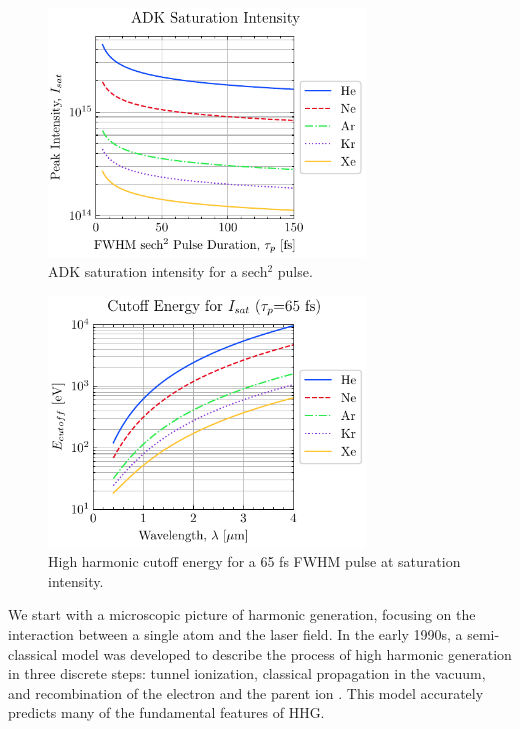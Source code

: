 \begin{figure}
	\centering
	\includegraphics[width=0.75\textwidth]{figures/chap1/saturation_intensity.pdf}
	\caption{ADK saturation intensity for a sech$^2$ pulse.}
	\label{fig:saturation_intensity}
\end{figure}

\begin{figure}
	\centering
	\includegraphics[width=0.75\textwidth]{figures/chap1/saturation_intensity_cutoff.pdf}
	\caption{High harmonic cutoff energy for a 65 fs FWHM pulse at saturation intensity.}
	\label{fig:saturation_intensity_cutoff}
\end{figure}


We start with a microscopic picture of harmonic generation, focusing on the interaction between a single atom and the laser field. In the early 1990s, a semi-classical model was developed to describe the process of high harmonic generation in three discrete steps: tunnel ionization, classical propagation in the vacuum, and recombination of the electron and the parent ion \cite{schaferThresholdIonizationHigh1993,corkumPlasmaPerspectiveStrong1993}. This model accurately predicts many of the fundamental features of HHG.

